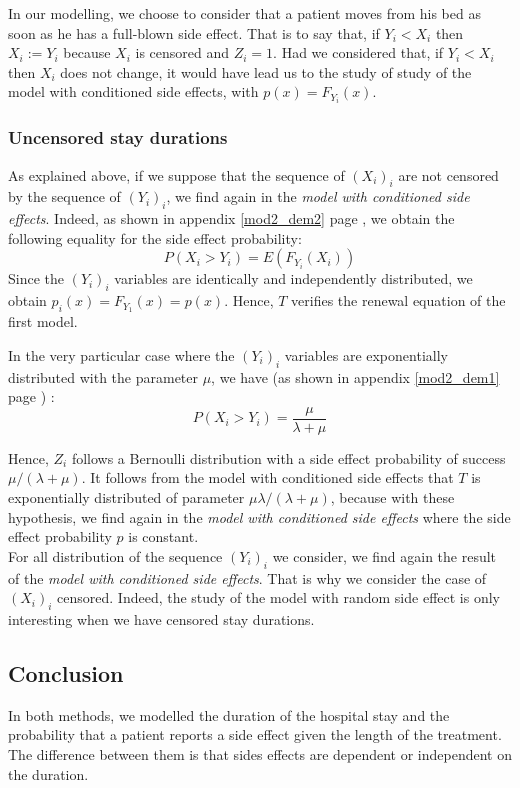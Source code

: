 \documentclass[12pt,twoside]{article}
\begin{document}
In our modelling, we choose to consider that a patient moves from his bed as soon as he has a full-blown side effect. That is to say that, if $Y_i < X_i$ then $X_i:=Y_i$ because $X_i$ is censored and $Z_i=1$. Had we considered that, if $Y_i < X_i$ then $X_i$ does not change, it would have lead us to the study of study of the model with conditioned side effects, with $p(x) =F_{Y_i}(x)$.




\subsubsection{Uncensored stay durations}
As explained above, if we suppose that the sequence of $(X_i)_i$ are not censored by the sequence of $(Y_i)_i$,
we find again in the \textsl{model with conditioned side effects}. Indeed, as shown in appendix 
\ref{mod2_dem2} page \pageref{mod2_dem2}, we obtain the following equality for the side effect probability:
$$
P(X_i>Y_i) = E(F_{Y_i}(X_i))
$$
Since the $(Y_i)_i$ variables are identically and independently distributed, we obtain $p_i(x) = F_{Y_1}(x)=p(x)$. Hence, $T$ 
verifies the renewal equation of the first model.

In the very particular case where the $(Y_i)_i$ variables are exponentially distributed with the parameter $\mu$,
we have (as shown in appendix \ref{mod2_dem1} page \pageref{mod2_dem1}) : 
$$
P(X_i>Y_i) = \frac{\mu}{\lambda+\mu}
$$

Hence, $Z_i$ follows a Bernoulli distribution with a side effect probability of success $\mu/(\lambda+\mu)$.
It follows from the model with conditioned side effects that $T$ is exponentially distributed of parameter $\mu\lambda/(\lambda+\mu)$, 
because with these hypothesis, we find again in the \textsl{model with conditioned side effects} where
the side effect probability $p$ is constant.\\

For all distribution of the sequence $(Y_i)_i$ we consider, we find 
again the result of the \textsl{model with conditioned side effects}. That is why we consider the case of $(X_i)_i$ censored. Indeed, the study of the model with random side effect is only interesting when we have censored stay durations.


\subsection*{Conclusion}

In both methods, we modelled the duration of the hospital stay and the probability that a patient reports a side effect given the length of the treatment. The difference between them is that sides effects are dependent or independent on the duration.\\
\end{document}
